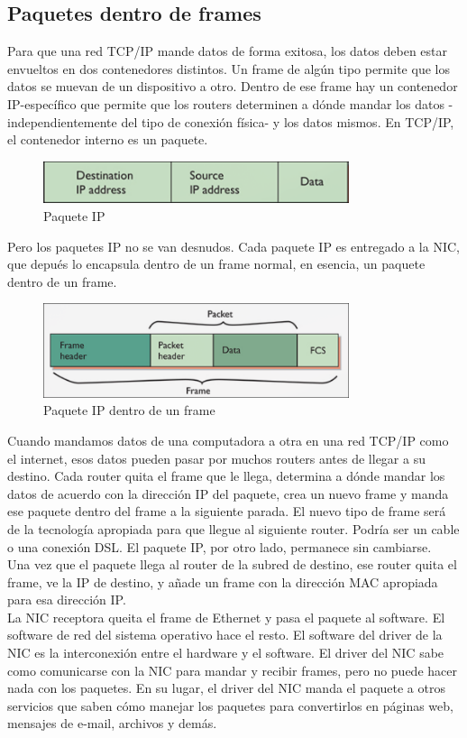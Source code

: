 \documentclass[12pt]{report}
\begin{document}
\subsection{Paquetes dentro de frames}
Para que una red TCP/IP mande datos de forma exitosa, los datos
deben estar envueltos en dos contenedores distintos.
Un frame de algún tipo permite que los datos se muevan de un 
dispositivo a otro. Dentro de ese frame hay un contenedor IP-específico
que permite que los routers determinen a dónde mandar los datos
-independientemente del tipo de conexión física- y los datos mismos.
En TCP/IP, el contenedor interno es un paquete.

\begin{figure}[h]
\centering
\includegraphics[width=0.8\textwidth]{Paquete.png}
\caption{Paquete IP}
\end{figure}

Pero los paquetes IP no se van desnudos. Cada paquete IP es entregado
a la NIC, que depués lo encapsula dentro de un frame normal,
en esencia, un paquete dentro de un frame.

\begin{figure}[h]
\centering
\includegraphics[width=0.8\textwidth]{Frame-Paquete.png}
\caption{Paquete IP dentro de un frame}
\end{figure}

Cuando mandamos datos de una computadora a otra en una red TCP/IP
como el internet, esos datos pueden pasar por muchos routers antes
de llegar a su destino. Cada router quita el frame que le llega, determina
a dónde mandar los datos de acuerdo con la dirección IP del paquete,
crea un nuevo frame y manda ese paquete dentro del frame a la siguiente 
parada. El nuevo tipo de frame será de la tecnología apropiada para
que llegue al siguiente router. Podría ser un cable o una conexión 
DSL. El paquete IP, por otro lado, permanece sin cambiarse.\\
Una vez que el paquete llega al router de la subred de destino, 
ese router quita el frame, ve la IP de destino, y añade un frame
con la dirección MAC apropiada para esa dirección IP.\\
La NIC receptora queita el frame de Ethernet y pasa el paquete al 
software. El software de red del sistema operativo hace el resto.
El software del driver de la NIC es la interconexión entre el hardware
y el software. El driver del NIC sabe como comunicarse con la NIC para 
mandar y recibir frames, pero no puede hacer nada con los paquetes.
En su lugar, el driver del NIC manda el paquete a otros servicios
que saben cómo manejar los paquetes para convertirlos en páginas web,
mensajes de e-mail, archivos y demás.
\end{document}
